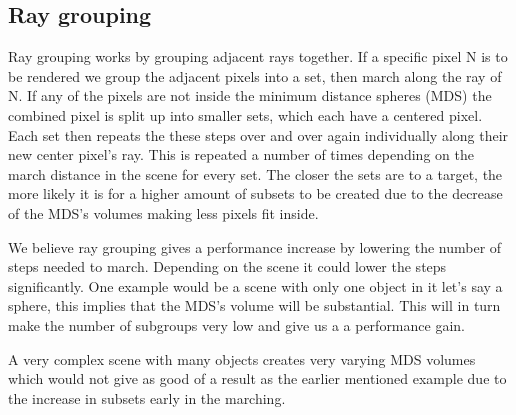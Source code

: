 			
		\subsection{Ray grouping}
		
			Ray grouping works by grouping adjacent rays together.  If a specific
			pixel N is to be rendered we group the adjacent pixels into a set,  then
			march along the ray of N. If any of the pixels are not inside the minimum
			distance spheres (MDS) the combined pixel is split up into smaller sets,
			which each have a centered pixel. Each set then repeats the these steps
			over and over again individually along their new center pixel's ray.
			This is repeated a number of times depending on the march distance in the
			scene for every set. The closer the sets are to a target, the more likely
			it is for a higher amount of subsets to be created due to the decrease of
			the MDS's volumes making less pixels fit inside.
			
			We believe ray grouping gives a performance increase by lowering the
			number of steps needed to march. Depending on the scene it could lower
			the steps significantly. One example would be a scene with only one
			object in it let's say a sphere, this implies that the MDS's volume will
			be substantial. This will in turn make the number of subgroups very low
			and give us a a performance gain. 
			
			A very complex scene with many objects creates very varying MDS volumes
			which would not give as good of a result as the earlier mentioned example
			due to the increase in subsets early in the marching.
			
